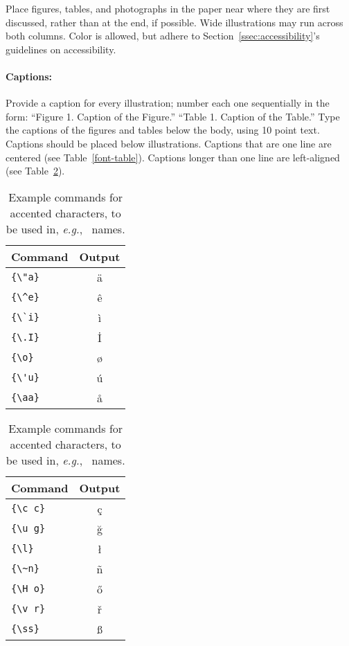  Place figures, tables, and photographs in the paper near where they are first discussed, rather than at the end, if possible.
 Wide illustrations may run across both columns.
 Color is allowed, but adhere to Section~\ref{ssec:accessibility}'s guidelines on accessibility.
 
 
 
 \paragraph{Captions:}
 Provide a caption for every illustration; number each one sequentially in the form:
 ``Figure 1. Caption of the Figure.''
 ``Table 1. Caption of the Table.''
 Type the captions of the figures and tables below the body, using 10 point text.
 Captions should be placed below illustrations.
 Captions that are one line are centered (see Table~\ref{font-table}).
 Captions longer than one line are left-aligned (see Table~\ref{tab:accents}).
 
 \begin{table}
 	\centering
 	\begin{tabular}{lc}
 		\hline
 		\textbf{Command} & \textbf{Output}\\
 		\hline
 		\verb|{\"a}| & {\"a} \\
 		\verb|{\^e}| & {\^e} \\
 		\verb|{\`i}| & {\`i} \\ 
 		\verb|{\.I}| & {\.I} \\ 
 		\verb|{\o}| & {\o} \\
 		\verb|{\'u}| & {\'u}  \\ 
 		\verb|{\aa}| & {\aa}  \\\hline
 	\end{tabular}
 	\begin{tabular}{lc}
 		\hline
 		\textbf{Command} & \textbf{Output}\\
 		\hline
 		\verb|{\c c}| & {\c c} \\ 
 		\verb|{\u g}| & {\u g} \\ 
 		\verb|{\l}| & {\l} \\ 
 		\verb|{\~n}| & {\~n} \\ 
 		\verb|{\H o}| & {\H o} \\ 
 		\verb|{\v r}| & {\v r} \\ 
 		\verb|{\ss}| & {\ss} \\
 		\hline
 	\end{tabular}
 	\caption{Example commands for accented characters, to be used in, \emph{e.g.}, \BibTeX\ names.}\label{tab:accents}
 \end{table}
 
